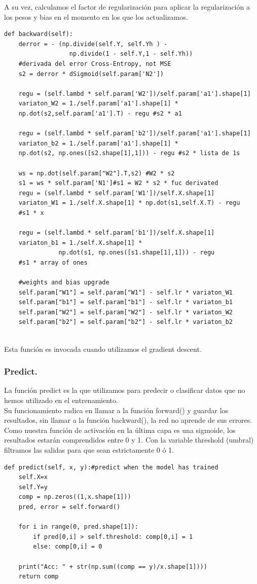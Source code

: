\documentclass[a4paper,11pt]{article}
\begin{document}
\noindent
A su vez, calculamos el factor de regularización para aplicar la regularización a los pesos y bias en el momento en los que los actualizamos.
\begin{lstlisting}
def backward(self):
    derror = - (np.divide(self.Y, self.Yh ) - 
                  np.divide(1 - self.Y,1 - self.Yh))
    #derivada del error Cross-Entropy, not MSE
    s2 = derror * dSigmoid(self.param['N2']) 

    regu = (self.lambd * self.param['W2'])/self.param['a1'].shape[1]
    variaton_W2 = 1./self.param['a1'].shape[1] *
    np.dot(s2,self.param['a1'].T) - regu #s2 * a1

    regu = (self.lambd * self.param['b2'])/self.param['a1'].shape[1]
    variaton_b2 = 1./self.param['a1'].shape[1] * 
    np.dot(s2, np.ones([s2.shape[1],1])) - regu #s2 * lista de 1s

    ws = np.dot(self.param["W2"].T,s2) #W2 * s2                    
    s1 = ws * self.param['N1']#s1 = W2 * s2 * fuc derivated      
    regu = (self.lambd * self.param['W1'])/self.X.shape[1]
    variaton_W1 = 1./self.X.shape[1] * np.dot(s1,self.X.T) - regu
    #s1 * x

    regu = (self.lambd * self.param['b1'])/self.X.shape[1]
    variaton_b1 = 1./self.X.shape[1] * 
               np.dot(s1, np.ones([s1.shape[1],1])) - regu 
    #s1 * array of ones 
    
    #weights and bias upgrade
    self.param["W1"] = self.param["W1"] - self.lr * variaton_W1 
    self.param["b1"] = self.param["b1"] - self.lr * variaton_b1 
    self.param["W2"] = self.param["W2"] - self.lr * variaton_W2 
    self.param["b2"] = self.param["b2"] - self.lr * variaton_b2
        
\end{lstlisting}
Esta función es invocada cuando utilizamos el gradient descent.
\subsubsection{Predict.}

La función predict es la que utilizamos para predecir o clasificar datos que no hemos utilizado en el entrenamiento.\\ 

\noindent
Su funcionamiento radica en llamar a la función forward() y guardar los resultados, sin llamar a la función backward(), la red no aprende de sus errores. \\

\noindent
Como nuestra función de activación en la última capa es una sigmoide, los resultados estarán comprendidos entre 0 y 1. Con la variable threshold (umbral) filtramos las salidas para que sean estrictamente 0 ó 1.  
\begin{lstlisting}
def predict(self, x, y):#predict when the model has trained
    self.X=x
    self.Y=y
    comp = np.zeros((1,x.shape[1]))
    pred, error = self.forward()    
    
    for i in range(0, pred.shape[1]):
        if pred[0,i] > self.threshold: comp[0,i] = 1
        else: comp[0,i] = 0
    
    print("Acc: " + str(np.sum((comp == y)/x.shape[1]))) 
    return comp
\end{lstlisting}
\end{document}
